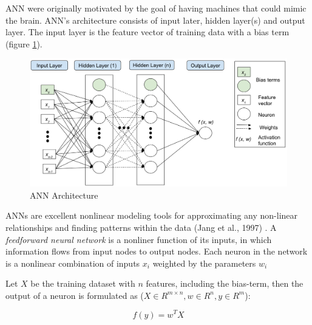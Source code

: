 \documentclass[12pt]{article}
\begin{document}
ANN were originally motivated by the goal of having machines that could mimic the brain. ANN's architecture consists of input later, hidden layer(s) and output layer. The input layer is the feature vector of training data with a bias term (figure \ref{fig:figure_ann_architecture}).
\begin{figure}[h]
	\centering
	\includegraphics[width=0.7\linewidth]{figure_ann_architecture}
	\caption[ANN Architecture]{ANN Architecture}
	\label{fig:figure_ann_architecture}
\end{figure}

ANNs are excellent nonlinear modeling tools for approximating any non-linear relationships and finding patterns within the data (Jang et al., 1997) \cite{jang}. A \textit{feedforward neural network} is a nonliner function of its inputs, in which information flows from input nodes to output nodes. Each neuron in the network is a nonlinear combination of inputs $x_i$ weighted by the parameters $w_i$

Let $X$ be the training dataset with $n$ features, including the bias-term, then the output of a neuron is formulated as ($X \in R^{m \times n}, w \in R^{n}, y \in R ^{m}$):

\begin{equation}
f(y) = w^{T}  X 
\end{equation}
\end{document}

